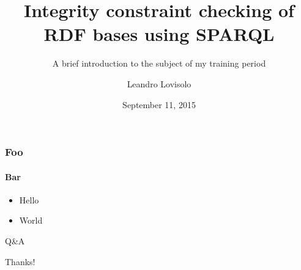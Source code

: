 \documentclass{beamer}
\title{Integrity constraint checking of RDF bases using SPARQL}
\subtitle{
  A brief introduction to the subject of my training period
}
\author{
  Leandro Lovisolo
}
\date{September 11, 2015}
\institute{
  I.N.R.A. SupAgro \\
  Montpellier, France
}
\begin{document}
\begin{frame}
  \titlepage
\end{frame}

\begin{frame}
  \frametitle{Foo}
  \framesubtitle{Bar}

  \pause

  \begin{itemize}
    \item Hello

    \pause

    \item World
  \end{itemize}
\end{frame}

\begin{frame}
  \begin{center}
    \Huge{Q\&A}
  \end{center}
\end{frame}

\begin{frame}
  \begin{center}
    \Huge{Thanks!}
  \end{center}
\end{frame}
\end{document}
